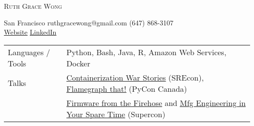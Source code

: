 \documentclass[letterpaper, oneside, final]{scrartcl} %
\begin{document}
\setlength{\pdfpagewidth}{8.5in}
\setlength{\pdfpageheight}{11in}

\begin{center} %


{\fontsize{36}{36}\spaceskip=12pt\selectfont\scshape Ruth Grace Wong} %

\vspace{1cm} %

{\renewcommand{\headfont}{\normalfont\rmfamily\scshape} %
\fontsize{12.5}{17}\selectfont\scshape %

San Francisco  {\large\textperiodcentered} ruthgracewong@gmail.com {\large\textperiodcentered} (647) 868-3107\\ %
\underline{\href{https://ruthgracewong.com}{Website}} {\large\textperiodcentered} \underline{\href{https://www.linkedin.com/in/ruthgracewong/}{LinkedIn}}
}

\vspace{0.2cm}

\begin{flushleft}
\begin{tabular}{ll}
     Languages / Tools & Python, Bash, Java, R, Amazon Web Services, Docker\\
     Talks & \underline{\href{https://www.usenix.org/conference/srecon18americas/presentation/wong}{Containerization War Stories}} (SREcon), \underline{\href{https://2017.pycon.ca/en/schedule/60/}{Flamegraph that!}} (PyCon Canada)\\
    & \underline{\href{https://hackaday.com/2019/02/22/supercon-ruth-grace-wong-and-firmware-from-the-firehose/}{Firmware from the Firehose}} and \underline{\href{https://hackaday.com/2020/01/03/you-could-be-a-manufacturing-engineer-if-you-could-only-find-the-time/}{Mfg Engineering in Your Spare Time}} (Supercon) \\
\end{tabular}
\end{flushleft}


\end{center}
\end{document}

